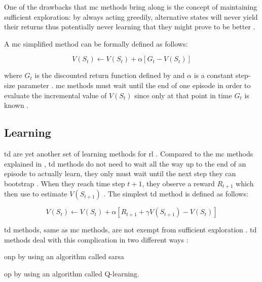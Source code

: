 \documentclass{seal_thesis}
\begin{document}
One of the drawbacks that \gls{mc} methods bring along is the concept of maintaining sufficient exploration: by always acting greedily, alternative states will never yield their returns thus potentially never learning that they might prove to be better \cite[p. 123]{Sutton2017}.

A \gls{mc} simplified method can be formally defined as follows:

\begin{equation}
\label{eq:mc_update}
	V(S_t) \leftarrow V(S_t) + \alpha [G_t - V(S_t)]
\end{equation}

where $G_t$ is the discounted return function defined by  and $\alpha$ is a constant step-size parameter \cite[p. 127]{Sutton2017}. \gls{mc} methods must wait until the end of one episode in order to evaluate the incremental value of $V(S_t)$ since only at that point in time $G_t$ is known \cite[p. 128]{Sutton2017}.

\subsection{ Learning}
\label{subsec:td_learning}

\gls{td} are yet another set of learning methods for \gls{rl} \cite{Sutton2017}. Compared to the \gls{mc} methods explained in , \gls{td} methods do not need to wait all the way up to the end of an episode to actually learn, they only must wait until the next step \ie they can bootstrap \cite[p. 128]{Sutton2017}. When they reach time step $t+1$, they observe a reward $R_{t+1}$ which then use to estimate $V(S_{t+1})$ \cite[p. 128]{Sutton2017}. The simplest \gls{td} method is defined as follows:

\begin{equation}
\label{eq:td_update}
	V(S_t) \leftarrow V(S_t) + \alpha [R_{t+1} + \gamma V(S_{t+1}) - V(S_t)]
\end{equation}

\gls{td} methods, same as \gls{mc} methods, are not exempt from sufficient exploration \cite[p. 147]{Sutton2017}. \gls{td} methods deal with this complication in two different ways \cite[p. 128]{Sutton2017}:
\begin{enumerate*}
	\item \gls{onp} by using an algorithm called \gls{sarsa}
	\item \gls{op} by using an algorithm called Q-learning.
\end{enumerate*}
\end{document}
